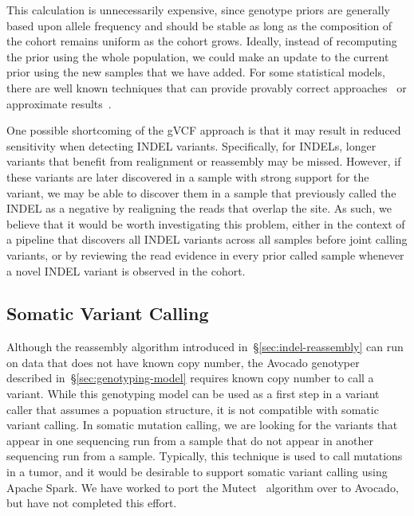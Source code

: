 \documentclass[phd]{ucbthesis}
\begin{document}
This calculation is unnecessarily expensive, since genotype priors are generally
based upon
allele frequency and should be stable as long as the composition of the cohort
remains uniform as the cohort grows. Ideally, instead of recomputing the prior
using the whole population, we could make an update to the current prior using
the new samples that we have added. For some statistical models, there are well
known techniques that can provide provably correct approaches~\cite{sherman50}
or approximate results~\cite{meng16}.

One possible shortcoming of the gVCF approach is that it may result in reduced
sensitivity when detecting INDEL variants. Specifically, for INDELs, longer
variants that benefit from realignment or reassembly may be missed. However, if
these variants are later discovered in a sample with strong support for the
variant, we may be able to discover them in a sample that previously called the
INDEL as a negative by realigning the reads that overlap the site. As such, we
believe that it would be worth investigating this problem, either in the context
of a pipeline that discovers all INDEL variants across all samples before joint
calling variants, or by reviewing the read evidence in every prior called sample
whenever a novel INDEL variant is observed in the cohort.

\subsection{Somatic Variant Calling}
\label{sec:somatic-variant-calling}

Although the reassembly algorithm introduced in~\S\ref{sec:indel-reassembly} can
run on data that does not have known copy number, the {Avocado} genotyper
described in~\S\ref{sec:genotyping-model} requires known copy number to call a
variant. While this genotyping model can be used as a first step in a variant
caller that assumes a popuation structure, it is not compatible with somatic
variant calling. In somatic mutation calling, we are looking for the variants
that appear in one sequencing run from a sample that do not appear in another
sequencing run from a sample. Typically, this technique is used to call mutations
in a tumor, and it would be desirable to support somatic variant calling using
{Apache Spark}. We have worked to port the
{Mutect}~\cite{cibulskis13} algorithm over to {Avocado}, but have
not completed this effort.
\end{document}
